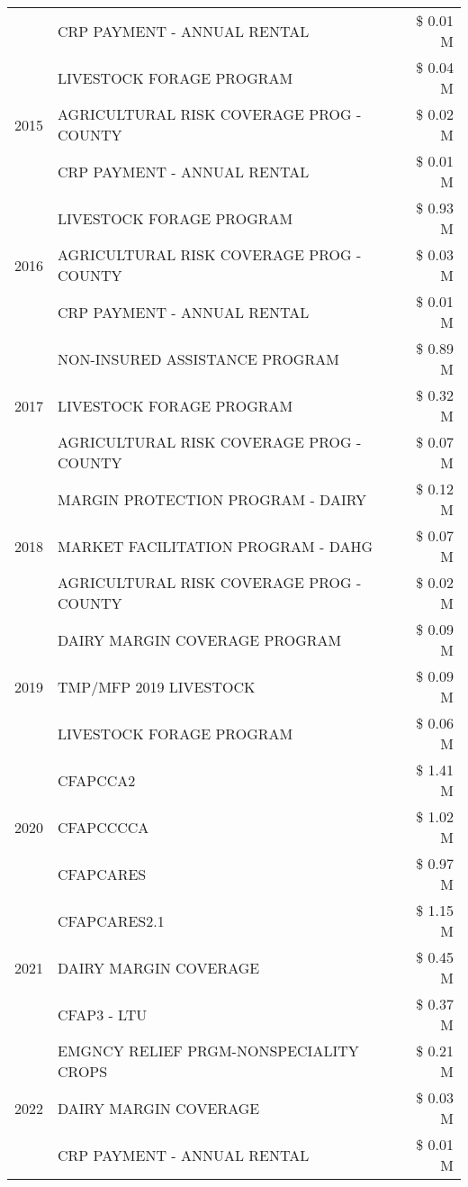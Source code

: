 \begin{tabular}{llr}
 & CRP PAYMENT - ANNUAL RENTAL & \$ 0.01 M \\
\cline{1-3}
\multirow[t]{3}{*}{2015} & LIVESTOCK FORAGE PROGRAM & \$ 0.04 M \\
 & AGRICULTURAL RISK COVERAGE PROG - COUNTY & \$ 0.02 M \\
 & CRP PAYMENT - ANNUAL RENTAL & \$ 0.01 M \\
\cline{1-3}
\multirow[t]{3}{*}{2016} & LIVESTOCK FORAGE PROGRAM & \$ 0.93 M \\
 & AGRICULTURAL RISK COVERAGE PROG - COUNTY & \$ 0.03 M \\
 & CRP PAYMENT - ANNUAL RENTAL & \$ 0.01 M \\
\cline{1-3}
\multirow[t]{3}{*}{2017} & NON-INSURED ASSISTANCE PROGRAM & \$ 0.89 M \\
 & LIVESTOCK FORAGE PROGRAM & \$ 0.32 M \\
 & AGRICULTURAL RISK COVERAGE PROG - COUNTY & \$ 0.07 M \\
\cline{1-3}
\multirow[t]{3}{*}{2018} & MARGIN PROTECTION PROGRAM - DAIRY & \$ 0.12 M \\
 & MARKET FACILITATION PROGRAM - DAHG & \$ 0.07 M \\
 & AGRICULTURAL RISK COVERAGE PROG - COUNTY & \$ 0.02 M \\
\cline{1-3}
\multirow[t]{3}{*}{2019} & DAIRY MARGIN COVERAGE PROGRAM & \$ 0.09 M \\
 & TMP/MFP 2019 LIVESTOCK & \$ 0.09 M \\
 & LIVESTOCK FORAGE PROGRAM & \$ 0.06 M \\
\cline{1-3}
\multirow[t]{3}{*}{2020} & CFAPCCA2 & \$ 1.41 M \\
 & CFAPCCCCA & \$ 1.02 M \\
 & CFAPCARES & \$ 0.97 M \\
\cline{1-3}
\multirow[t]{3}{*}{2021} & CFAPCARES2.1 & \$ 1.15 M \\
 & DAIRY MARGIN COVERAGE & \$ 0.45 M \\
 & CFAP3 - LTU & \$ 0.37 M \\
\cline{1-3}
\multirow[t]{3}{*}{2022} & EMGNCY RELIEF PRGM-NONSPECIALITY CROPS & \$ 0.21 M \\
 & DAIRY MARGIN COVERAGE & \$ 0.03 M \\
 & CRP PAYMENT - ANNUAL RENTAL & \$ 0.01 M \\
\cline{1-3}
\bottomrule
\end{tabular}

